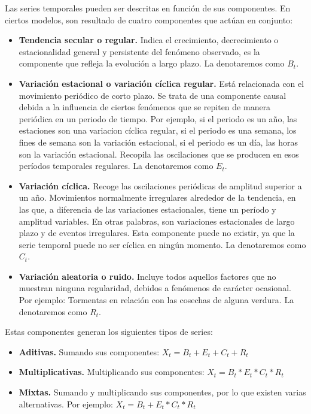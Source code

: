 \documentclass[a4paper,10pt]{article}
\begin{document}
Las series temporales pueden ser descritas en función de sus componentes. En ciertos modelos, son resultado de cuatro componentes que actúan en conjunto:

\begin{itemize}

 \item \textbf{Tendencia secular o regular.} Indica el crecimiento, decrecimiento o estacionalidad general y persistente del fenómeno observado, es la componente que refleja la evolución a largo plazo. La denotaremos como $B_t$.

 \item \textbf{Variación estacional o variación cíclica regular.} Está relacionada con el movimiento periódico de corto plazo. Se trata de una componente causal debida a la influencia de ciertos fenómenos que se repiten de manera periódica en un periodo de tiempo. Por ejemplo, si el periodo es un año, las estaciones son una variacion cíclica regular, si el periodo es una semana, los fines de semana son la variación estacional, si el periodo es un día, las horas son la variación estacional. Recopila las oscilaciones que se producen en esos períodos temporales regulares. La denotaremos como $E_t$.

\item \textbf{Variación cíclica.} Recoge las oscilaciones periódicas de amplitud superior a un año. Movimientos normalmente irregulares alrededor de la tendencia, en las que, a diferencia de las variaciones estacionales, tiene un período y amplitud variables. En otras palabras, son variaciones estacionales de largo plazo y de eventos irregulares. Esta componente puede no existir, ya que la serie temporal puede no ser cíclica en ningún momento. La denotaremos como $C_t$.

 \item \textbf{Variación aleatoria o ruido.} Incluye todos aquellos factores que no muestran ninguna regularidad, debidos a fenómenos de carácter ocasional. Por ejemplo: Tormentas en relación con las cosechas de alguna verdura. La denotaremos como $R_t$.

\end{itemize}

Estas componentes generan los siguientes tipos de series:

\begin{itemize}
 \item \textbf{Aditivas.} Sumando sus componentes: $X_t = B_t + E_t + C_t + R_t$

 \item \textbf{Multiplicativas.} Multiplicando sus componentes: $X_t = B_t * E_t * C_t * R_t$

 \item \textbf{Mixtas.} Sumando y multiplicando sus componentes, por lo que existen varias alternativas. Por ejemplo: $X_t = B_t + E_t * C_t * R_t$
\end{itemize}
\end{document}
